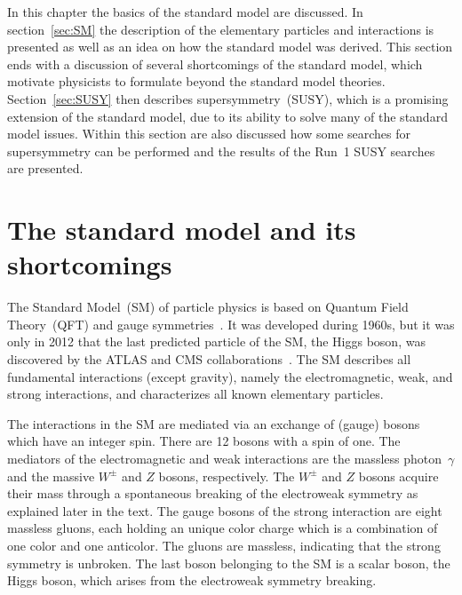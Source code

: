 \clearpage

\setcounter{secnumdepth}{4}
\setcounter{secnumdepth}{4}

In this chapter the basics of the standard model are discussed. In section~\ref{sec:SM} the description of the elementary particles and interactions is presented as well as an idea on how the standard model was derived. This section ends with a discussion of several shortcomings of the standard model, which motivate physicists to formulate beyond the standard model theories. Section~\ref{sec:SUSY} then describes supersymmetry~(SUSY), which is a promising extension of the standard model, due to its ability to solve many of the standard model issues. Within this section are also discussed how some searches for supersymmetry can be performed and  the results of the Run~1 SUSY searches are presented. 

\section{The standard model and its shortcomings~\label{sec:SM}}

The Standard Model~(SM) of particle physics is based on Quantum Field Theory~(QFT) and gauge symmetries~\cite{9783527406012}. It was developed during 1960s, but it was only in 2012 that the last predicted particle of the SM, the Higgs boson, was discovered by the ATLAS and CMS collaborations~\cite{Chatrchyan:2012xdj, Aad:2012tfa}. The SM describes all fundamental interactions (except gravity), namely the electromagnetic, weak, and strong interactions, and characterizes all known elementary particles. 


The interactions in the SM are mediated via an exchange of (gauge) bosons which have an integer spin. There are 12 bosons with a spin of one. The mediators of the electromagnetic and weak interactions are the massless photon~$\gamma$ and the massive $W^{\pm}$ and $Z$ bosons, respectively. The $W^{\pm}$ and $Z$ bosons acquire their mass through a spontaneous breaking of the electroweak symmetry as explained later in the text. The gauge bosons of the strong interaction are eight massless gluons, each holding an unique color charge which is a combination of one color and one anticolor. The gluons are massless, indicating that the strong symmetry is unbroken. The last boson belonging to the SM is a scalar boson, the Higgs boson, which arises from the electroweak symmetry breaking. 

